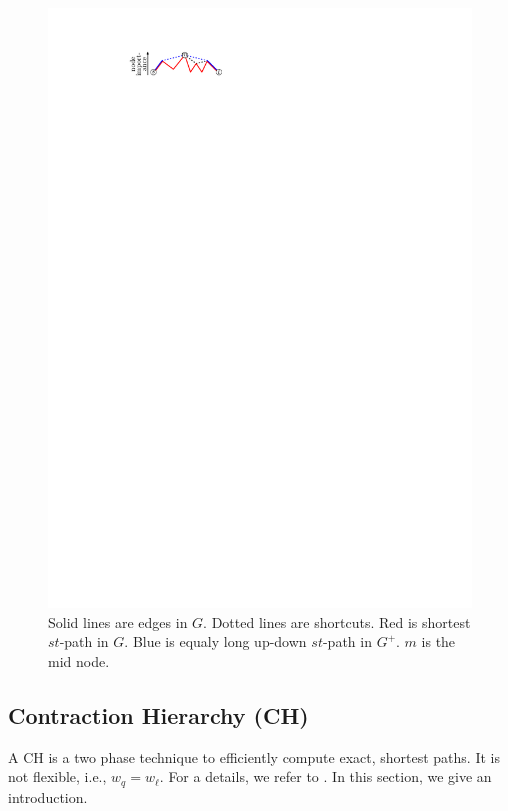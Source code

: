 \documentclass[letterpaper]{article} %
\begin{document}
\begin{figure}
\centering
\includegraphics{fig/ch}
\caption{
Solid lines are edges in $G$. Dotted lines are shortcuts. Red is shortest $st$-path in $G$. Blue is equaly long up-down $st$-path in $G^+$. $m$ is the mid node.
}
\label{fig:ch}
\end{figure}

\subsection{Contraction Hierarchy (CH)}

A CH is a two phase technique to efficiently compute exact, shortest paths.
It is not flexible, i.e., $w_q=w_\ell$.
For a details, we refer to \cite{gssv-erlrn-12,dsw-cch-15}.
In this section, we give an introduction.
\end{document}
